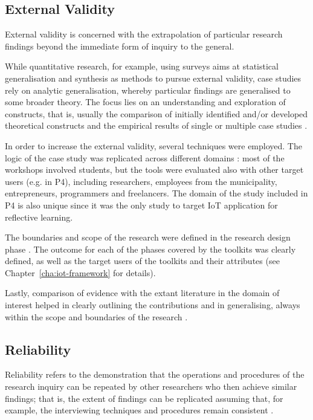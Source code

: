 \subsection{External Validity}
External validity is concerned with the extrapolation of particular research findings beyond the immediate form of inquiry to the general.

While quantitative research, for example, using surveys aims at statistical generalisation and synthesis as methods to pursue external validity, case studies rely on analytic generalisation, whereby particular findings are generalised to some broader theory. The focus lies on an understanding and exploration of constructs, that is, usually the comparison of initially identified and/or developed theoretical constructs and the empirical results of single or multiple case studies \autocite{riege_validity_2003}.

In order to increase the external validity, several techniques were employed. The logic of the case study was replicated across different domains \autocites{eisenhardt_building_1989}{parkhe_messy_1993}: most of the workshops involved students, but the tools were evaluated also with other target users (e.g. in P4), including researchers, employees from the municipality, entrepreneurs, programmers and freelancers. The domain of the study included in P4 is also unique since it was the only study to target IoT application for reflective learning.

The boundaries and scope of the research were defined in the research design phase \autocite{marshall_designing_2014}. The outcome for each of the phases covered by the toolkits was clearly defined, as well as the target users of the toolkits and their attributes (see Chapter~\ref{cha:iot-framework} for details).

Lastly, comparison of evidence with the extant literature in the domain of interest helped in clearly outlining the contributions and in generalising, always within the scope and boundaries of the research \autocite{yin_case_2017}.

\subsection{Reliability}
Reliability refers to the demonstration that the operations and procedures of the research inquiry can be repeated by other researchers who then achieve similar findings; that is, the extent of findings can be replicated assuming that, for example, the interviewing techniques and procedures remain consistent \autocite{riege_validity_2003}.

